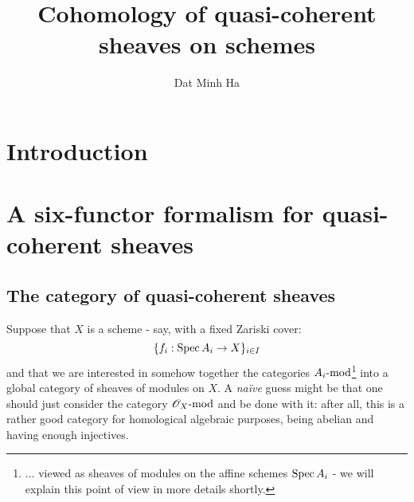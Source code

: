 

\setcounter{section}{-1}





    \title{Cohomology of quasi-coherent sheaves on schemes}
    
    \author{Dat Minh Ha}
    \maketitle
    
    \begin{abstract}
        
    \end{abstract}
    
    {
      \hypersetup{} 
      \tableofcontents %
    }

    \section{Introduction}

    \section{A six-functor formalism for quasi-coherent sheaves}
        \subsection{The category of quasi-coherent sheaves}
            Suppose that $X$ is a scheme - say, with a fixed Zariski cover:
                $$\{ f_i: \Spec A_i \to X \}_{i \in I}$$
            and that we are interested in somehow  together the categories $A_i\mod$\footnote{... viewed as sheaves of modules on the affine schemes $\Spec A_i$ - we will explain this point of view in more details shortly.} into a global category of sheaves of modules on $X$. A \textit{na\"ive} guess might be that one should just consider the category $\scrO_X\mod$ and be done with it: after all, this is a rather good category for homological algebraic purposes, being abelian and having enough injectives.
            
